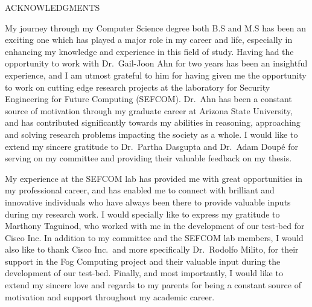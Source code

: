 \begin{center}
ACKNOWLEDGMENTS
\end{center}
My journey through my Computer Science degree both B.S and M.S has been an exciting one which has played a major role in my career and life, especially in enhancing my knowledge and experience in this field of study. Having had the opportunity to work with Dr.\ Gail-Joon Ahn for two years has been an insightful experience, and I am utmost grateful to him for having given me the opportunity to work on cutting edge research projects at the laboratory for Security Engineering for Future Computing (SEFCOM). Dr.\ Ahn has been a constant source of motivation through my graduate career at Arizona State University, and has contributed significantly towards my abilities in  reasoning, approaching and solving research problems impacting the society as a whole. I would like to extend my sincere gratitude to Dr.\ Partha Dasgupta  and Dr.\ Adam Doup\'e for serving on my committee and providing their valuable feedback on my thesis. 

My experience at the SEFCOM lab has provided me with great opportunities in my professional career, and has enabled me to connect with brilliant and innovative individuals who have always been there to provide valuable inputs during my research work. I would specially like to express my gratitude to Marthony Taguinod, who worked with me in the development of our test-bed for Cisco Inc. In addition to my committee and the SEFCOM lab members, I would also like to thank Cisco Inc.\ and more specifically Dr.\ Rodolfo Milito, for their support in the Fog Computing project and their valuable input during the development of our test-bed. Finally, and most importantly, I would like to extend my sincere love and regards to my parents for being a constant source of motivation and support throughout my academic career.